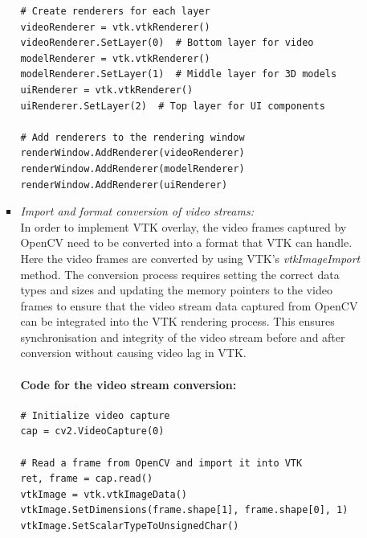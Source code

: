 \documentclass[12pt]{article}
\begin{document}
\begin{enumerate}
\begin{enumerate}
\begin{itemize}
\begin{verbatim}
# Create renderers for each layer
videoRenderer = vtk.vtkRenderer()
videoRenderer.SetLayer(0)  # Bottom layer for video
modelRenderer = vtk.vtkRenderer()
modelRenderer.SetLayer(1)  # Middle layer for 3D models
uiRenderer = vtk.vtkRenderer()
uiRenderer.SetLayer(2)  # Top layer for UI components

# Add renderers to the rendering window
renderWindow.AddRenderer(videoRenderer)
renderWindow.AddRenderer(modelRenderer)
renderWindow.AddRenderer(uiRenderer)
                              \end{verbatim}
                              \item \textit{Import and format conversion of video streams:}
                              \\
                              In order to implement VTK overlay, the video frames captured by OpenCV need to be converted into a format that VTK can handle. Here the video frames are converted by using VTK's \emph{vtkImageImport} method. The conversion process requires setting the correct data types and sizes and updating the memory pointers to the video frames to ensure that the video stream data captured from OpenCV can be integrated into the VTK rendering process. This ensures synchronisation and integrity of the video stream before and after conversion without causing video lag in VTK.\cite{vtk_image_import_doc,vtk_image_import_2023}
                              \paragraph{Code for the video stream conversion:}
                              \begin{verbatim}
# Initialize video capture
cap = cv2.VideoCapture(0)

# Read a frame from OpenCV and import it into VTK
ret, frame = cap.read()
vtkImage = vtk.vtkImageData()
vtkImage.SetDimensions(frame.shape[1], frame.shape[0], 1)
vtkImage.SetScalarTypeToUnsignedChar()


\end{verbatim}
\end{itemize}
\end{enumerate}
\end{enumerate}
\end{document}
